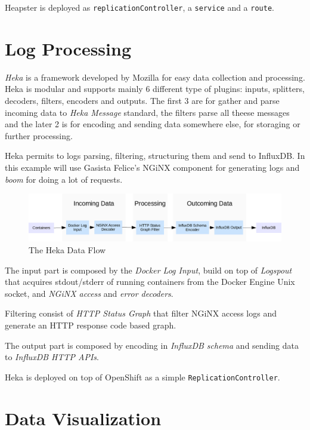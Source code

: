 Heapster is deployed as \texttt{replicationController}, a
\texttt{service} and a \texttt{route}.

\section{Log Processing}\label{log-processing}

\emph{Heka} is a framework developed by Mozilla for easy data collection
and processing. Heka is modular and supports mainly 6 different type of
plugins: inputs, splitters, decoders, filters, encoders and outputs. The
first 3 are for gather and parse incoming data to \emph{Heka Message}
standard, the filters parse all theese messages and the later 2 is for
encoding and sending data somewhere else, for storaging or further
processing.

Heka permits to logs parsing, filtering, structuring them and send to
InfluxDB. In this example will use Gasista Felice's NGiNX component for
generating logs and \emph{boom} for doing a lot of requests.

\begin{figure}[htbp]
\centering
\includegraphics{media/ch6-heka.png}
\caption{The Heka Data Flow}
\end{figure}

The input part is composed by the \emph{Docker Log Input}, build on top
of \emph{Logspout} that acquires stdout/stderr of running containers
from the Docker Engine Unix socket, and \emph{NGiNX access} and
\emph{error decoders}.

Filtering consist of \emph{HTTP Status Graph} that filter NGiNX access
logs and generate an HTTP response code based graph.

The output part is composed by encoding in \emph{InfluxDB schema} and
sending data to \emph{InfluxDB HTTP APIs}.

Heka is deployed on top of OpenShift as a simple
\texttt{ReplicationController}.

\section{Data Visualization}\label{data-visualization}

